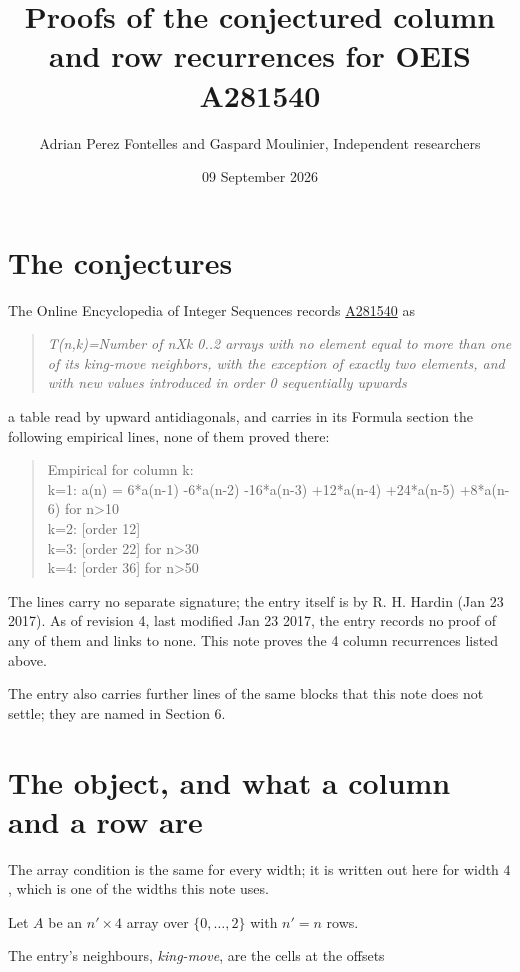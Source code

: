\documentclass[11pt]{article}
\title{Proofs of the conjectured column and row recurrences for OEIS A281540}
\author{Adrian Perez Fontelles and Gaspard Moulinier, Independent researchers}
\date{09 September 2026}
\theoremstyle{definition}
\begin{document}
\maketitle
\section{The conjectures}

The Online Encyclopedia of Integer Sequences records \href{https://oeis.org/A281540}{A281540} as

\begin{quote}\itshape T(n,k)=Number of nXk 0..2 arrays with no element equal to more than one of its king-move neighbors, with the exception of exactly two elements, and with new values introduced in order 0 sequentially upwards\end{quote}

a table read by upward antidiagonals, and carries in its Formula section the following empirical lines, none of them proved there:

\begin{quote}\ttfamily Empirical for column k:\\
k=1: a(n) = 6*a(n-1) -6*a(n-2) -16*a(n-3) +12*a(n-4) +24*a(n-5) +8*a(n-6) for n>10\\k=2: [order 12]\\k=3: [order 22] for n>30\\k=4: [order 36] for n>50\end{quote}

The lines carry no separate signature; the entry itself is by R. H. Hardin (Jan 23 2017). As of revision 4, last modified Jan 23 2017, the entry records no proof of any of them and links to none. This note proves the 4 column recurrences listed above.

The entry also carries further lines of the same blocks that this note does not settle; they are named in Section 6.

\section{The object, and what a column and a row are}

The array condition is the same for every width; it is written out here for width $4$, which is one of the widths this note uses.

Let $A$ be an $n' \times 4$ array over $\{0,\dots,2\}$ with $n' = n$ rows.

The entry's neighbours, {\itshape king-move}, are the cells at the offsets
\end{document}
